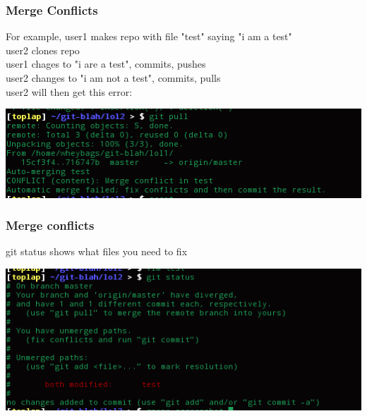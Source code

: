 \documentclass[xcolor=dvipsnames]{beamer}
\begin{document}
\begin{frame}
    \frametitle{Merge Conflicts}

    For example, user1 makes repo with file "test" saying "i am a test"\\
    user2 clones repo\\
    user1 chages to "i are a test", commits, pushes\\
    user2 changes to "i am not a test", commits, pulls\\

    user2 will then get this error:
    \begin{center}
        \includegraphics[scale=0.4]{mergeconflict1.png}
    \end{center}
\end{frame}

\begin{frame}
    \frametitle{Merge conflicts}

    git status shows what files you need to fix

    \begin{center}
        \includegraphics[scale=0.4]{mergeconflict2.png}
    \end{center}
\end{frame}
 
\end{document}
